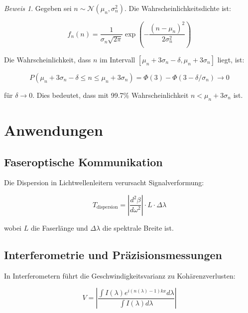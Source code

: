 \documentclass[12pt,a4paper,oneside]{article}
\theoremstyle{definition}
\theoremstyle{remark}
\newtheorem*{beweis}{Beweis}
\newcommand{\refIndex}{n}
\begin{document}
\begin{beweis}
Gegeben sei $\refIndex \sim \mathcal{N}(\mu_n, \sigma_n^2)$. Die Wahrscheinlichkeitsdichte ist:

\begin{equation}
    f_{\refIndex}(n) = \frac{1}{\sigma_n\sqrt{2\pi}} \exp\left(-\frac{(n-\mu_n)^2}{2\sigma_n^2}\right)
\end{equation}

Die Wahrscheinlichkeit, dass $\refIndex$ im Intervall $[\mu_n + 3\sigma_n - \delta, \mu_n + 3\sigma_n]$ liegt, ist:

\begin{equation}
    P(\mu_n + 3\sigma_n - \delta \leq \refIndex \leq \mu_n + 3\sigma_n) = \Phi(3) - \Phi(3 - \delta/\sigma_n) \to 0
\end{equation}

für $\delta \to 0$. Dies bedeutet, dass mit 99.7\% Wahrscheinlichkeit $\refIndex < \mu_n + 3\sigma_n$ ist.
\end{beweis}

\section{Anwendungen}

\subsection{Faseroptische Kommunikation}

Die Dispersion in Lichtwellenleitern verursacht Signalverformung:

\begin{equation}
    T_{\text{dispersion}} = \left|\frac{d^2 \beta}{d\omega^2}\right| \cdot L \cdot \Delta \lambda
\end{equation}

wobei $L$ die Faserlänge und $\Delta \lambda$ die spektrale Breite ist.

\subsection{Interferometrie und Präzisionsmessungen}

In Interferometern führt die Geschwindigkeitsvarianz zu Kohärenzverlusten:

\begin{equation}
    V = \left|\frac{\int I(\lambda) e^{i(n(\lambda)-1)kx} d\lambda}{\int I(\lambda) d\lambda}\right|
\end{equation}
\end{document}
